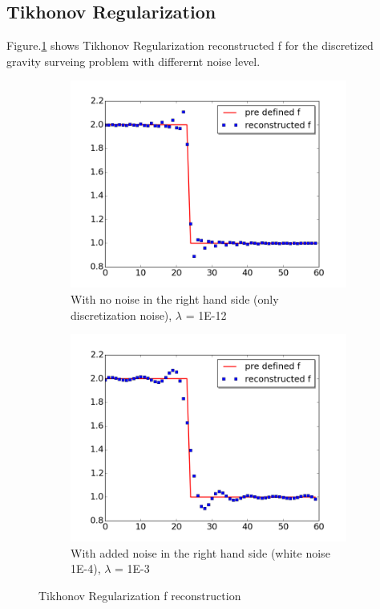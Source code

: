 \documentclass{article}
\begin{document}
\subsection{Tikhonov Regularization}
Figure.\ref{fig:tikhonov_plot} shows Tikhonov Regularization reconstructed f for the
discretized gravity surveing problem with differernt noise level.
\begin{figure}
	\centering
		\begin{subfigure}[b]{0.7\textwidth}
			\includegraphics[width=\textwidth]{images/TikhonovRegularization/tikhonovplot}
			\caption{With
			no noise in the right hand side (only discretization noise), \(\lambda \) =
			1E-12}
		\end{subfigure}
		\begin{subfigure}[b]{0.7\textwidth}
			\includegraphics[width=\textwidth]{images/TikhonovRegularization/tikhonovplot_withnoise}
			\caption{With
			added noise in the right hand side (white noise 1E-4), \(\lambda \) =
			1E-3}
		\end{subfigure}
		\caption{Tikhonov Regularization f reconstruction}\label{fig:tikhonov_plot}
\end{figure}
\end{document}
